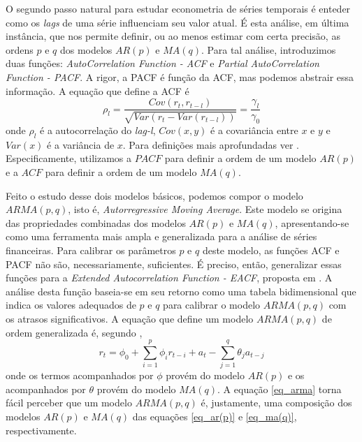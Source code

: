 \documentclass[12pt]{article}
\begin{document}
O segundo passo natural para estudar econometria de séries temporais é enteder como os \textit{lags} de uma série influenciam seu valor atual. É esta análise, em última instância, que nos permite definir, ou ao menos estimar com certa precisão, as ordens $p$ e $q$ dos modelos $AR(p)$ e $MA(q)$. Para tal análise, introduzimos duas funções: \textit{AutoCorrelation Function - ACF} e \textit{Partial AutoCorrelation Function - PACF}. A rigor, a PACF é função da ACF, mas podemos abstrair essa informação. A equação que define a ACF é
\begin{equation}\label{eq_acf}
\rho_{l}=\dfrac{Cov(r_{t},r_{t-l})}{\sqrt{Var(r_{t}-Var(r_{t-l}))}}=\dfrac{\gamma_{l}}{\gamma_{0}}
\end{equation}
onde $\rho_{l}$ é a autocorrelação do \textit{lag-l}, $Cov(x,y)$ é a covariância entre $x$ e $y$ e $Var(x)$ é a variância de $x$. Para definições mais aprofundadas ver \cite{Tsay}. Especificamente, utilizamos a $PACF$ para definir a ordem de um modelo $AR(p)$ e a $ACF$ para definir a ordem de um modelo $MA(q)$.

Feito o estudo desse dois modelos básicos, podemos compor o modelo $ARMA(p,q)$, isto
é, \textit{Autorregressive Moving Average}. Este modelo se origina das propriedades combinadas
dos modelos $AR(p)$ e $MA(q)$, apresentando-se como uma ferramenta mais ampla e
generalizada para a análise de séries financeiras. Para calibrar os parâmetros $p$ e $q$ deste
modelo, as funções ACF e PACF não são, necessariamente, suficientes. É preciso, então,
generalizar essas funções para a \textit{Extended Autocorrelation Function - EACF}, proposta em \cite{Tsay-Tiao1984}. A análise desta função baseia-se em seu retorno como uma tabela bidimensional que indica os valores adequados de $p$ e $q$ para calibrar o modelo $ARMA(p,q)$ com os atrasos significativos. A equação que define um modelo $ARMA(p,q)$ de ordem generalizada é, segundo \cite{Tsay},
\begin{equation}\label{eq_arma}
r_{t}=\phi_{0}+\sum_{i=1}^{p}\phi_{i}r_{t-i}+a_{t}-\sum_{j=1}^{q}\theta_{j}a_{t-j}
\end{equation}
onde os termos acompanhados por $\phi$ provém do modelo $AR(p)$ e os acompanhados por $\theta$ provém do modelo $MA(q)$. A equação \ref{eq_arma} torna fácil perceber que um modelo $ARMA(p,q)$ é, justamente, uma composição dos modelos $AR(p)$ e $MA(q)$ das equações \ref{eq_ar(p)} e \ref{eq_ma(q)}, respectivamente. 
\end{document}
